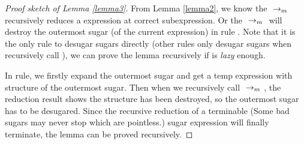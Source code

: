 \begin{proof}[Proof sketch of Lemma \ref{lemma3}]
From Lemma \ref{lemma2}, we know the $~\rightarrow_m~$ recursively reduces a expression at correct subexpression. Or the $~\rightarrow_m~$ will destroy the outermost sugar (of the current expression) in rule . Note that it is the only rule to desugar sugars directly (other rules only desugar sugars when recursively call ), we can prove the lemma recursively if  is \emph{lazy} enough.

In  rule, we firstly expand the outermost sugar and get a temp expression with structure of the outermost sugar. Then when we recursively call $~\rightarrow_m~$, the reduction result shows the structure has been destroyed, so the outermost sugar has to be desugared. Since the recursive reduction of a terminable (Some bad sugars may never stop which are pointless.) sugar expression will finally terminate, the lemma can be proved recursively.
\end{proof}
